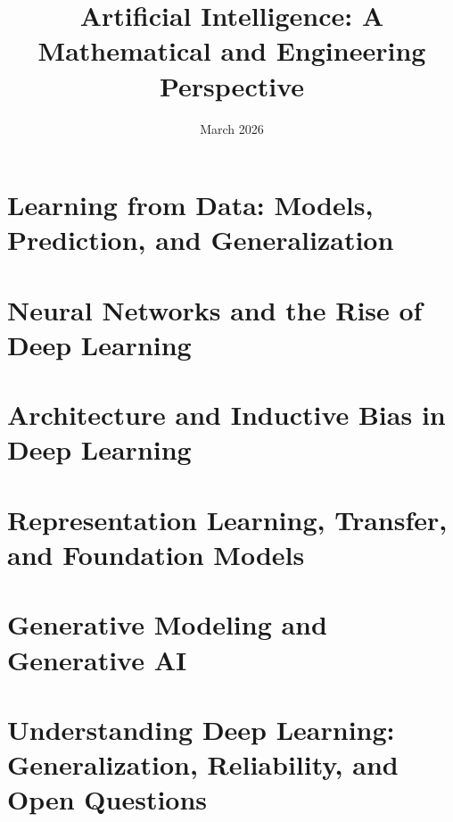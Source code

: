\documentclass[11pt]{book}
\title{Artificial Intelligence: A Mathematical and Engineering Perspective}
\author{}
\date{March 2026}
\theoremstyle{plain}
\theoremstyle{definition}
\theoremstyle{remark}
\begin{document}
\frontmatter
\maketitle
\tableofcontents

\mainmatter

\chapter{Learning from Data: Models, Prediction, and Generalization}








\chapter{Neural Networks and the Rise of Deep Learning}











\chapter{Architecture and Inductive Bias in Deep Learning}











\chapter{Representation Learning, Transfer, and Foundation Models}










\chapter{Generative Modeling and Generative AI}











\chapter{Understanding Deep Learning: Generalization, Reliability, and Open Questions}








\backmatter
{}
\end{document}
